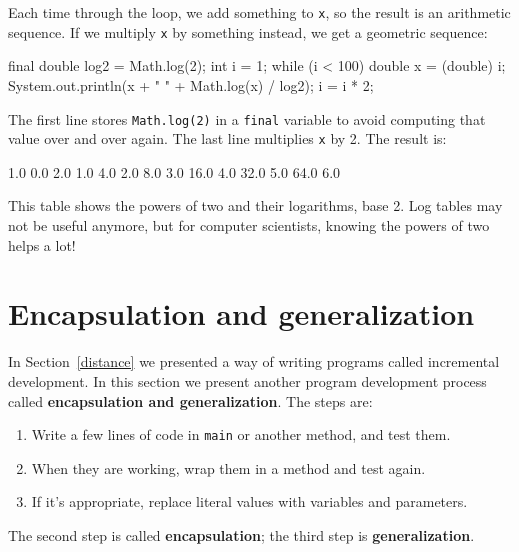 \documentclass[12pt]{book}
\theoremstyle{exercise}
\newcommand{\java}[1]{\verb"#1"}
\begin{document}
Each time through the loop, we add something to \java{x}, so the result is an arithmetic sequence.
If we multiply \java{x} by something instead, we get a geometric sequence:

\begin{code}
    final double log2 = Math.log(2);
    int i = 1;
    while (i < 100) {
        double x = (double) i;
        System.out.println(x + "   " + Math.log(x) / log2);
        i = i * 2;
    }
\end{code}

The first line stores \java{Math.log(2)} in a \java{final} variable to avoid computing that value over and over again.
The last line multiplies \java{x} by 2.
The result is:

\begin{stdout}
1.0   0.0
2.0   1.0
4.0   2.0
8.0   3.0
16.0   4.0
32.0   5.0
64.0   6.0
\end{stdout}

This table shows the powers of two and their logarithms, base 2.
Log tables may not be useful anymore, but for computer scientists, knowing the powers of two helps a lot!


\section{Encapsulation and generalization}
\label{encapsulation}


In Section~\ref{distance} we presented a way of writing programs called incremental development.
In this section we present another program development process called {\bf encapsulation and generalization}.
The steps are:

\begin{enumerate}

\item Write a few lines of code in \java{main} or another method, and test them.

\item When they are working, wrap them in a method and test again.

\item If it's appropriate, replace literal values with variables and parameters.

\end{enumerate}

The second step is called {\bf encapsulation}; the third step is {\bf generalization}.
\end{document}
